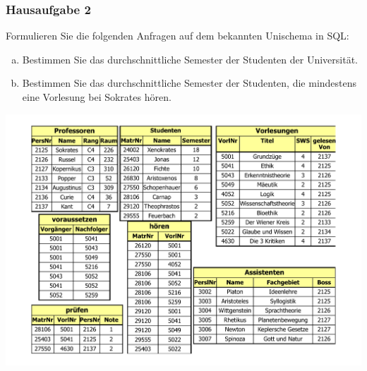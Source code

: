 \begin{frame}
	\frametitle{Hausaufgabe 2}
	\vspace{0.25cm}

	\begin{multicols}{2}
		Formulieren Sie die folgenden Anfragen auf dem bekannten Unischema in SQL:
		\begin{enumerate}[a)]
			\item Bestimmen Sie das durchschnittliche Semester der Studenten der Universität.
			\item Bestimmen Sie das durchschnittliche Semester der Studenten, die mindestens eine Vorlesung bei Sokrates hören.
		\end{enumerate}
		\vfill\columnbreak

		\begin{center}
			\includegraphics[height=.6\paperheight]{../img/uni.pdf}
		\end{center}
	\end{multicols}
\end{frame}

